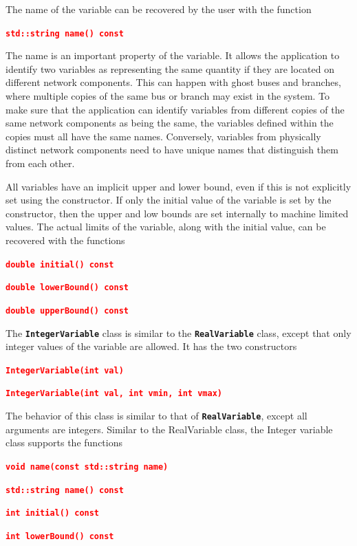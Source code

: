 \documentclass[12pt]{report} %
\begin{document}
The name of the variable can be recovered by the user with the function

\textcolor{red}{\texttt{\textbf{std::string name() const}}}

The name is an important property of the variable. It allows the application to identify two variables as representing the same quantity if they are located on different network components. This can happen with ghost buses and branches, where multiple copies of the same bus or branch may exist in the system. To make sure that the application can identify variables from different copies of the same network components as being the same, the variables defined within the copies must all have the same names. Conversely, variables from physically distinct network components need to have unique names that distinguish them from each other.

All variables have an implicit upper and lower bound, even if this is not explicitly set using the constructor. If only the initial value of the variable is set by the constructor, then the upper and low bounds are set internally to machine limited values. The actual limits of the variable, along with the initial value, can be recovered with the functions

\textcolor{red}{\texttt{\textbf{double initial() const}}}

\textcolor{red}{\texttt{\textbf{double lowerBound() const}}}

\textcolor{red}{\texttt{\textbf{double upperBound() const}}}

The \texttt{\textbf{IntegerVariable}} class is similar to the \texttt{\textbf{RealVariable}} class, except that only integer values of the variable are allowed. It has the two constructors

\textcolor{red}{\texttt{\textbf{IntegerVariable(int val)}}}

\textcolor{red}{\texttt{\textbf{IntegerVariable(int val, int vmin, int vmax)}}}

The behavior of this class is similar to that of \texttt{\textbf{RealVariable}}, except all arguments are integers. Similar to the RealVariable class, the Integer variable class supports the functions

\textcolor{red}{\texttt{\textbf{void name(const std::string name)}}}

\textcolor{red}{\texttt{\textbf{std::string name() const}}}

\textcolor{red}{\texttt{\textbf{int initial() const}}}

\textcolor{red}{\texttt{\textbf{int lowerBound() const}}}
\end{document}
